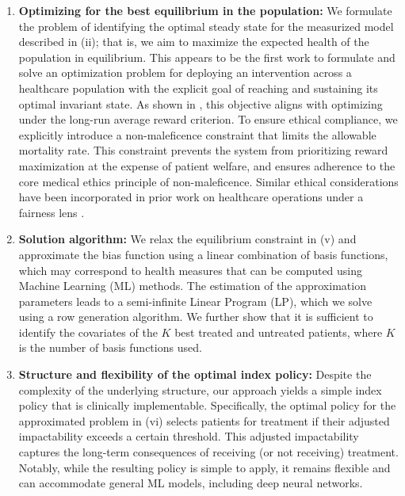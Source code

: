 \documentclass[12pt,a4paper]{article}
\begin{document}
\begin{enumerate}
        We are not aware of any prior work modeling a controlled healthcare population as a measure-valued process. 
		\item[(v)] {\bf Optimizing for the best equilibrium in the population: } We formulate the problem of identifying the optimal steady state for the measurized model described in (ii); that is, we aim to maximize the expected health of the population in equilibrium. This appears to be the first work to formulate and solve an optimization problem for deploying an intervention across a healthcare population with the explicit goal of reaching and sustaining its optimal invariant state. As shown in \cite{measurized}, this objective aligns with optimizing under the long-run average reward criterion. To ensure ethical compliance, we explicitly introduce a non-maleficence constraint that limits the allowable mortality rate. This constraint prevents the system from prioritizing reward maximization at the expense of patient welfare, and ensures adherence to the core medical ethics principle of non-maleficence. Similar ethical considerations have been incorporated in prior work on healthcare operations under a fairness lens \citep{bertsimas2013fairness, olsen2011concepts, mccoy2014using}. %
		\item[(vi)] {\bf Solution algorithm:} We relax the equilibrium constraint in (v) and approximate the bias function using a linear combination of basis functions, which may correspond to health measures that can be computed using Machine Learning (ML) methods. The estimation of the approximation parameters leads to a semi-infinite Linear Program (LP), which we solve using a row generation algorithm. We further show that it is sufficient to identify the covariates of the $K$ best treated and untreated patients, where $K$ is the number of basis functions used.
		\item[(vii)] {\bf Structure and flexibility of the optimal index policy:} Despite the complexity of the underlying structure, our approach yields a simple index policy that is clinically implementable. Specifically, the optimal policy for the approximated problem in (vi) selects patients for treatment if their adjusted impactability exceeds a certain threshold. This adjusted impactability captures the long-term consequences of receiving (or not receiving) treatment. Notably, while the resulting policy is simple to apply, it remains flexible and can accommodate general ML models, including deep neural networks. 

\end{enumerate}
\end{document}
